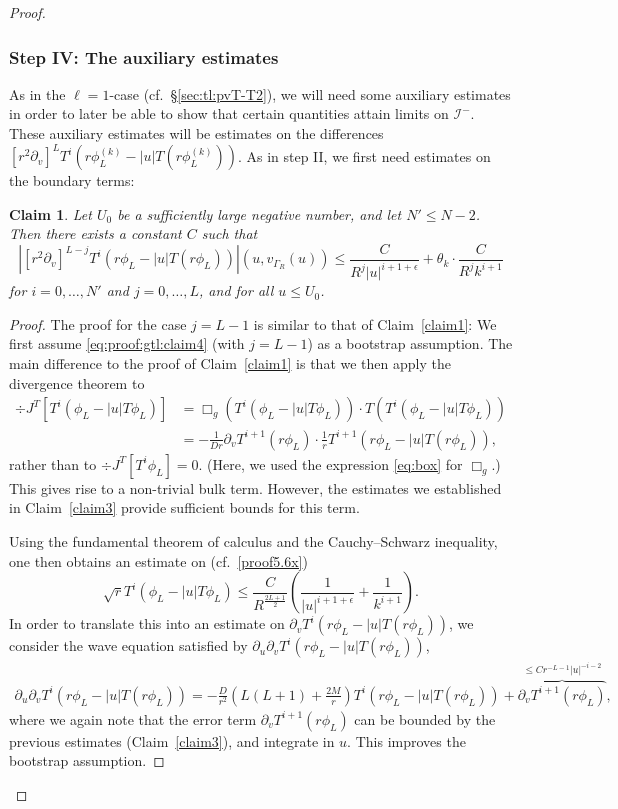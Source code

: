 \documentclass[11pt,english]{article}
\numberwithin{equation}{section}
\theoremstyle{remark}
\theoremstyle{plain}
\newtheorem{claim}{Claim}
\newenvironment{nalign}{
    \begin{equation}
    \begin{aligned}
}{
    \end{aligned}
    \end{equation}
    \ignorespacesafterend
}
\theoremstyle{remark}
\newcommand{\pu}{\partial_u}
\newcommand{\pv}{\partial_v}
\renewcommand{\(}{\left(}
\renewcommand{\)}{\right)}
\begin{document}
\begin{proof}
\subsubsection*{Step IV: The auxiliary estimates}
As in the $\ell=1$-case (cf.\ \S\ref{sec:tl:pvT-T2}), we will need some auxiliary estimates in order to later be able to show that certain quantities attain limits on $\mathcal{I}^-$. These auxiliary estimates will be estimates on the differences $[r^2\pv]^{L}T^i \left(r\phi^{(k)}_L-|u| T(r\phi^{(k)}_L)\right)$. As in step II, we first need estimates on the boundary terms:
	\begin{claim}\label{claim4}
	Let $U_0$ be a sufficiently large negative number, and let $N'\leq N-2$. Then there exists a constant $C$ such that 
	\begin{equation}\label{eq:proof:gtl:claim4}
	\left|[r^2\pv]^{L-j}T^i (r\phi_L-|u| T(r\phi_L))\right|(u,v_{\Gamma_R}(u))\leq \frac{C}{R^{j}|u|^{i+1+		\epsilon}}+\theta_k\cdot\frac{C}{R^{j}k^{i+1}}
	\end{equation}
	 for $i=0,\dots,N'$ and $j=0, \dots, L$, and for all $u\leq U_0$.
	\end{claim}
\begin{proof}
The proof for the case $j=L-1$ is similar to that of Claim~\ref{claim1}:
 We first assume \eqref{eq:proof:gtl:claim4} (with $j=L-1$) as a bootstrap assumption. 
 The main difference to the proof of Claim~\ref{claim1} is that we then apply the divergence theorem to 
\begin{align*}
\div J^T[T^i(\phi_L-|u|T\phi_L)]&=\Box_g(T^i(\phi_L-|u|T\phi_L))\cdot T(T^i(\phi_L-|u|T\phi_L))\\
&=-\frac{1}{Dr}\pv T^{i+1}(r\phi_L)\cdot\frac{1}{r}T^{i+1}(r\phi_L-|u|T(r\phi_L)),
\end{align*}
rather than to $\div J^T[T^i\phi_L]=0$. (Here, we used the expression \eqref{eq:box} for $\Box_g$.) This gives rise to a non-trivial bulk term. However, the estimates we established in Claim~\ref{claim3} provide sufficient bounds for this term.
 
Using the fundamental theorem of calculus and the Cauchy--Schwarz inequality, one then obtains an estimate on (cf.\ \eqref{proof5.6x})
$$\sqrt{r}T^i(\phi_L-|u|T\phi_L)\leq \frac{C}{R^{\frac{2L+1}{2}}}\left(\frac{1}{|u|^{i+1+\epsilon}}+\frac{1}{k^{i+1}}\right).$$ 
In order to translate this into an estimate on $\pv T^i(r\phi_L-|u|T(r\phi_L))$, we consider the wave equation satisfied by $\pu\pv T^i(r\phi_L-|u|T(r\phi_L))$,
\begin{nalign}
\pu\pv T^i(r\phi_L-|u|T(r\phi_L))
=-\frac{D}{r^2}\left(L(L+1)+\frac{2M}{r}\right)T^i(r\phi_L-|u|T(r\phi_L))+\overbrace{\pv T^{i+1}(r\phi_L)}^{\leq Cr^{-L-1}|u|^{-i-2}},
\end{nalign}
where we again note that the error term $\pv T^{i+1}(r\phi_L)$ can be bounded by the previous estimates (Claim~\ref{claim3}), and integrate in $u$. This improves the bootstrap assumption.


\end{proof}
\end{proof}
\end{document}

